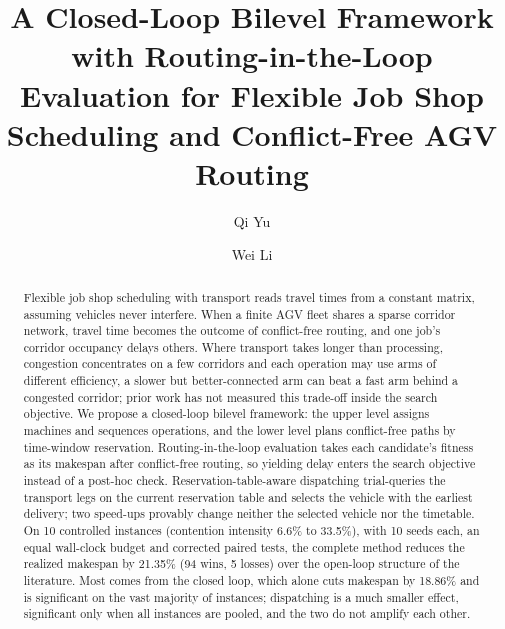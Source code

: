 \documentclass[preprint,review,12pt,authoryear]{elsarticle}
\newcommand{\NCases}{10}
\newcommand{\NSeeds}{10}
\newcommand{\GainLoopRule}{18.86\%}      %
\newcommand{\GainEndToEnd}{21.35\%}      %
\newcommand{\WinEndToEnd}{94}
\newcommand{\LoseEndToEnd}{5}
\newcommand{\ContentionLo}{6.6\%}
\newcommand{\ContentionHi}{33.5\%}
\begin{document}
\begin{frontmatter}

\title{A Closed-Loop Bilevel Framework with Routing-in-the-Loop Evaluation for Flexible Job Shop Scheduling and Conflict-Free AGV Routing}

\author[cse]{Qi Yu}
\author[cs]{Wei Li}


\begin{abstract}
Flexible job shop scheduling with transport reads travel times from a constant matrix, assuming vehicles never interfere.
When a finite AGV fleet shares a sparse corridor network, travel time becomes the outcome of conflict-free routing, and one job's corridor occupancy delays others.
Where transport takes longer than processing, congestion concentrates on a few corridors and each operation may use arms of different efficiency, a slower but better-connected arm can beat a fast arm behind a congested corridor; prior work has not measured this trade-off inside the search objective.
We propose a closed-loop bilevel framework: the upper level assigns machines and sequences operations, and the lower level plans conflict-free paths by time-window reservation.
Routing-in-the-loop evaluation takes each candidate's fitness as its makespan after conflict-free routing, so yielding delay enters the search objective instead of a post-hoc check.
Reservation-table-aware dispatching trial-queries the transport legs on the current reservation table and selects the vehicle with the earliest delivery; two speed-ups provably change neither the selected vehicle nor the timetable.
On \NCases{} controlled instances (contention intensity \ContentionLo{} to \ContentionHi{}), with \NSeeds{} seeds each, an equal wall-clock budget and corrected paired tests, the complete method reduces the realized makespan by \GainEndToEnd{} (\WinEndToEnd{} wins, \LoseEndToEnd{} losses) over the open-loop structure of the literature.
Most comes from the closed loop, which alone cuts makespan by \GainLoopRule{} and is significant on the vast majority of instances; dispatching is a much smaller effect, significant only when all instances are pooled, and the two do not amplify each other.
\end{abstract}


\end{frontmatter}
\end{document}
